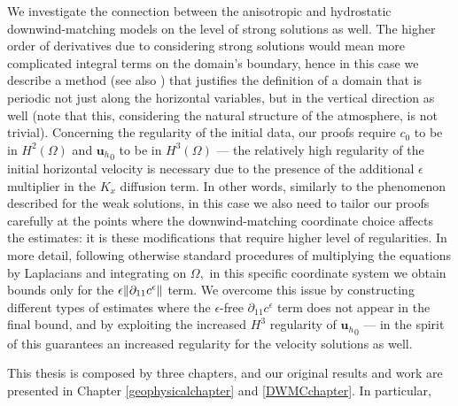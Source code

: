 \documentclass[12pt]{report}
\numberwithin{theorem}{chapter}
\numberwithin{corollary}{chapter}
\numberwithin{lemma}{chapter}
\numberwithin{remark}{chapter}
\numberwithin{definition}{chapter}
\numberwithin{prop}{chapter}
\begin{document}
We investigate the connection between the anisotropic and hydrostatic downwind-matching models on the level of strong solutions as well. The higher order of derivatives due to considering strong solutions would mean more complicated integral terms on the domain's boundary, hence in this case we describe a method (see also \cite{cao2014local}) that justifies the definition of a domain that is periodic not just along the horizontal variables, but in the vertical direction as well (note that this, considering the natural structure of the atmosphere, is not trivial). Concerning the regularity of the initial data, our proofs require $c_0$ to be in $H^2(\Omega)$ and ${\mathbf{u}_h}_0$ to be in $H^3(\Omega)$ --- the relatively high regularity of the initial horizontal velocity is necessary due to the presence of the additional $\epsilon$ multiplier in the $K_x$ diffusion term. In other words, similarly to the phenomenon described for the weak solutions, in this case we also need to tailor our proofs carefully at the points where the downwind-matching coordinate choice affects the estimates: it is these modifications that require higher level of regularities. In more detail, following otherwise standard procedures of multiplying the equations by Laplacians and integrating on $\Omega,$ in this specific coordinate system we obtain bounds only for the $\epsilon \norm{\partial_{11} c^\epsilon}$ term. We overcome this issue by constructing different types of estimates where the $\epsilon$-free $\partial_{11} c^\epsilon$ term does not appear in the final bound, and by exploiting the increased $H^3$ regularity of ${\mathbf{u}_h}_0$ --- in the spirit of \cite{li2019primitive} this guarantees an increased regularity for the velocity solutions as well.

This thesis is composed by three chapters, and our original results and work are presented in Chapter \ref{geophysicalchapter} and \ref{DWMCchapter}. In particular,
\end{document}
